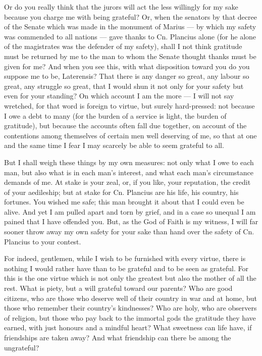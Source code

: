  Or do you really think that the jurors will act the less willingly for my sake because you charge me with being grateful? Or, when the senators by that decree of the Senate which was made in the monument of Marius --- by which my safety was commended to all nations --- gave thanks to Cn. Plancius alone (for he alone of the magistrates was the defender of my safety), shall I not think gratitude must be returned by me to the man to whom the Senate thought thanks must be given for me? And when you see this, with what disposition toward you do you suppose me to be, Laterensis? That there is any danger so great, any labour so great, any struggle so great, that I would shun it not only for your safety but even for your standing? On which account I am the more --- I will not say wretched, for that word is foreign to virtue, but surely hard-pressed: not because I owe a debt to many (for the burden of a service is light, the burden of gratitude), but because the accounts often fall due together, on account of the contentions among themselves of certain men well deserving of me, so that at one and the same time I fear I may scarcely be able to seem grateful to all.

 But I shall weigh these things by my own measures: not only what I owe to each man, but also what is in each man's interest, and what each man's circumstance demands of me. At stake is your zeal, or, if you like, your reputation, the credit of your aedileship; but at stake for Cn. Plancius are his life, his country, his fortunes. You wished me safe; this man brought it about that I could even be alive. And yet I am pulled apart and torn by grief, and in a case so unequal I am pained that I have offended you. But, as the God of Faith is my witness, I will far sooner throw away my own safety for your sake than hand over the safety of Cn. Plancius to your contest.

 For indeed, gentlemen, while I wish to be furnished with every virtue, there is nothing I would rather have than to be grateful and to be seen as grateful. For this is the one virtue which is not only the greatest but also the mother of all the rest. What is piety, but a will grateful toward our parents? Who are good citizens, who are those who deserve well of their country in war and at home, but those who remember their country's kindnesses? Who are holy, who are observers of religion, but those who pay back to the immortal gods the gratitude they have earned, with just honours and a mindful heart? What sweetness can life have, if friendships are taken away? And what friendship can there be among the ungrateful?

